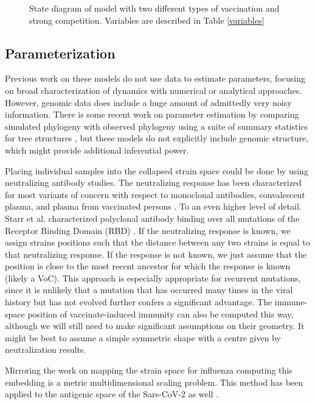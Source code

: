 \documentclass{article}
\begin{document}
\begin{figure}[h!]
    \centering
    
\caption{State diagram of model with two different types of vaccination and strong competition. Variables are described in Table \ref{variables}}
\label{model_structure}
\end{figure}

\subsection{Parameterization}

Previous work on these models do not use data to estimate parameters, focusing on broad characterization of dynamics with numerical or analytical approaches. However, genomic data does include a huge amount of admittedly very noisy information. There is some recent work on parameter estimation by comparing simulated phylogeny with observed phylogeny using a suite of summary statistics for tree structures \cite{danesh2021quantifying,leventhal2012inferring,saulnier2017inferring}, but these models do not explicitly include genomic structure, which might provide additional inferential power. 

Placing individual samples into the collapsed strain space could be done by using neutralizing antibody studies. The neutralizing response has been characterized for most variants of concern with respect to monoclonal antibodies, convalescent plasma, and plasma from vaccinated persons \cite{stanford2020}. To an even higher level of detail. Starr et al. characterized polyclonal antibody binding over all mutations of the Receptor Binding Domain (RBD) \cite{starr2020deep}. If the neutralizing response is known, we assign strains positions such that the distance between any two strains is equal to that neutralizing response. If the response is not known, we just assume that the position is close to the most recent ancestor for which the response is known (likely a VoC). This approach is especially appropriate for recurrent mutations, since it is unlikely that a mutation that has occurred many times in the viral history but has not evolved further confers a significant advantage. The immune-space position of vaccinate-induced immunity can also be computed this way, although we will still need to make significant assumptions on their geometry. It might be best to assume a simple symmetric shape with a centre given by neutralization results. 

Mirroring the work on mapping the strain space for influenza \cite{lapedesGeometryShapeSpace2001, smithMappingAntigenicGenetic2004, cai2010computational} computing this embedding is a metric multidimensional scaling problem. This method has been applied to the antigenic space of the Sars-CoV-2 as well \cite{millerAntigenicSpaceFramework2021, wilksMappingSARSCoV2Antigenic2022, van2022mapping}. 



\end{document}
